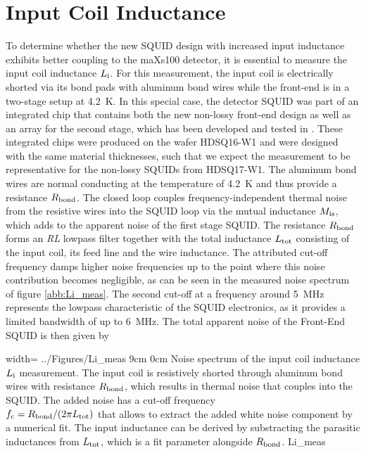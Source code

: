 \section{Input Coil Inductance} \label{subsec_Li}

To determine whether the new SQUID design with increased input inductance exhibits better coupling to the maXs100 detector, it is essential to measure the input coil inductance $L_{\rm i}$. For this measurement, the input coil is electrically shorted via its bond pads with aluminum bond wires while the front-end is in a two-stage setup at \qty{4.2}{\kelvin}. In this special case, the detector SQUID was part of an integrated chip that contains both the new non-lossy front-end design as well as an array for the second stage, which has been developed and tested in \cite{Kraemer2023}. These integrated chips were produced on the wafer HDSQ16-W1 and were designed with the same material thicknesses, such that we expect the measurement to be representative for the non-lossy SQUIDs from HDSQ17-W1. The aluminum bond wires are normal conducting at the temperature of \qty{4.2}{\kelvin} and thus provide a resistance $R_{\rm bond}$. The closed loop couples frequency-independent thermal noise from the resistive wires into the SQUID loop via the mutual inductance $M_{\rm is}$, which adds to the apparent noise of the first stage SQUID. The resistance $R_{\rm bond}$ forms an \textit{RL} lowpass filter together with the total inductance $L_{\rm tot}$ consisting of the input coil, its feed line and the wire inductance. The attributed cut-off frequency damps higher noise frequencies up to the point where this noise contribution becomes negligible, as can be seen in the measured noise spectrum of figure \ref{abb:Li_meas}. The second cut-off at a frequency around \qty{5}{\MHz} represents the lowpass characteristic of the SQUID electronics, as it provides a limited bandwidth of up to \qty{6}{\MHz}. The total apparent noise of the Front-End SQUID is then given by     

{width=\textwidth} %
{../Figures/Li_meas}
{9cm} %
{0cm}
{Noise spectrum of the input coil inductance $L_{\rm i}$ measurement. The input coil is resistively shorted through aluminum bond wires with resistance $R_{\rm bond}$, which results in thermal noise that couples into the SQUID. The added noise has a cut-off frequency\\ $f_{\rm c}=R_{\rm bond}/(2\pi L_{\rm tot})$ that allows to extract the added white noise component by a numerical fit. The input inductance can be derived by substracting the parasitic inductances from $L_{\rm tot}$, which is a fit parameter alongside $R_{\rm bond}$.}
{Li_meas}

